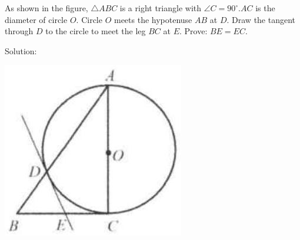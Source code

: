 \documentclass{article}
\begin{document}
As shown in the figure, \(\triangle A B C\) is a right triangle with \(\angle C=90^{\circ} . A C\) is the diameter of circle \(O\). Circle \(O\) meets the hypotenuse \(A B\) at \(D\). Draw the tangent through \(D\) to the circle to meet the leg \(B C\) at \(E\). Prove: \(B E=E C\).

Solution:
\begin{center}
\includegraphics[width=\textwidth]{images/194(3).jpg}
\end{center}
\end{document}
